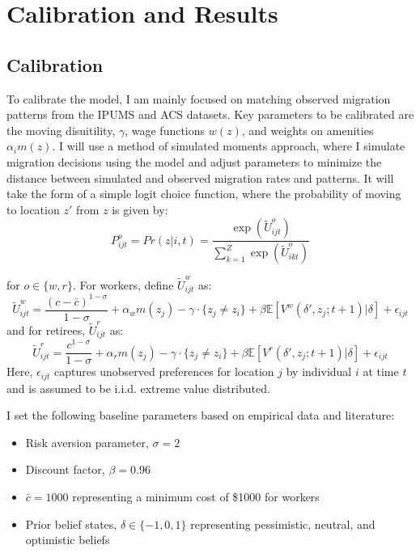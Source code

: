 \documentclass[11pt,a4paper]{article}
\begin{document}
\section{Calibration and Results}
\label{sec:results_analysis}

\subsection{Calibration}
\label{subsec:calibration}

To calibrate the model, I am mainly focused on matching observed migration patterns from the IPUMS and ACS datasets. Key parameters to be calibrated are the moving disuitility, $\gamma$, wage functions $w(z)$, and weights on amenities $\alpha_im(z)$. I will use a method of simulated moments approach, where I simulate migration decisions using the model and adjust parameters to minimize the distance between simulated and observed migration rates and patterns. It will take the form of a simple logit choice function, where the probability of moving to location $z'$ from $z$ is given by:
\begin{equation}
  P^o_{ijt} = Pr(z | i, t) = \frac{\exp(\tilde{U}^o_{ijt})}{\sum_{k=1}^{Z}\exp(\tilde{U}^o_{ikt})}
\end{equation}

for $o \in \{w, r\}$. For workers, define $\tilde{U}^w_{ijt}$ as:
\begin{equation}
  \tilde{U}^w_{ijt} = \frac{(c - \bar{c})^{1-\sigma}}{1-\sigma} + \alpha_w m(z_j) - \gamma\cdot\{z_j \ne z_i\} + \beta\mathbb{E}[V^w(\delta', z_j; t+1)|\delta] + \epsilon_{ijt}
\end{equation}
and for retirees, $\tilde{U}^r_{ijt}$ as:
\begin{equation}
  \tilde{U}^r_{ijt} = \frac{c^{1-\sigma}}{1-\sigma} + \alpha_r m(z_j) - \gamma\cdot\{z_j \ne z_i\} + \beta\mathbb{E}[V^r(\delta', z_j; t+1)|\delta] + \epsilon_{ijt}
\end{equation}
Here, $\epsilon_{ijt}$ captures unobserved preferences for location $j$ by individual $i$ at time $t$ and is assumed to be i.i.d. extreme value distributed.

I set the following baseline parameters based on empirical data and literature:
\begin{itemize}
  \item Risk aversion parameter, $\sigma = 2$
  \item Discount factor, $\beta = 0.96$
  \item $\bar{c} = 1000$ representing a minimum cost of \$1000 for workers
  \item Prior belief states, $\delta \in \{-1, 0, 1\}$ representing pessimistic, neutral, and optimistic beliefs
\end{itemize}
\end{document}
